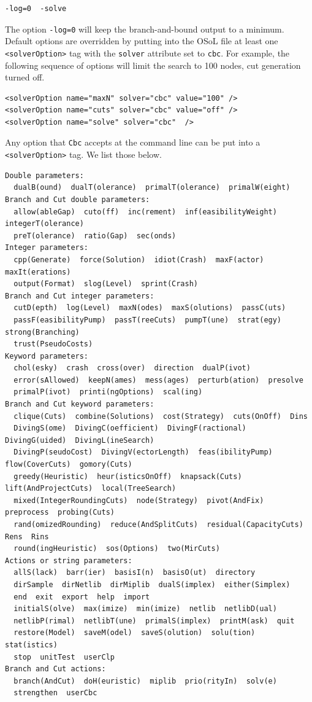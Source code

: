 \begin{verbatim}
-log=0  -solve 
\end{verbatim}
The option {\tt -log=0} will keep the branch-and-bound output to a minimum.  Default options are overridden by 
putting into the OSoL file at least one {\tt <solverOption>} tag with the {\tt solver} attribute 
set to {\tt cbc}.    For example, the following sequence of options will limit the search to 100 nodes, 
cut generation turned off.

\begin{verbatim}
<solverOption name="maxN" solver="cbc" value="100" />
<solverOption name="cuts" solver="cbc" value="off" />
<solverOption name="solve" solver="cbc"  />
\end{verbatim}

Any option that {\tt Cbc} accepts at the command line can be put into a {\tt <solverOption>} tag. We list  those below.

{\small
\begin{verbatim}
Double parameters:
  dualB(ound)  dualT(olerance)  primalT(olerance)  primalW(eight)  
Branch and Cut double parameters:
  allow(ableGap)  cuto(ff)  inc(rement)  inf(easibilityWeight)  integerT(olerance)  
  preT(olerance)  ratio(Gap)  sec(onds)  
Integer parameters:
  cpp(Generate)  force(Solution)  idiot(Crash)  maxF(actor)  maxIt(erations)  
  output(Format)  slog(Level)  sprint(Crash)  
Branch and Cut integer parameters:
  cutD(epth)  log(Level)  maxN(odes)  maxS(olutions)  passC(uts)  
  passF(easibilityPump)  passT(reeCuts)  pumpT(une)  strat(egy)  strong(Branching)  
  trust(PseudoCosts)  
Keyword parameters:
  chol(esky)  crash  cross(over)  direction  dualP(ivot)  
  error(sAllowed)  keepN(ames)  mess(ages)  perturb(ation)  presolve  
  primalP(ivot)  printi(ngOptions)  scal(ing)  
Branch and Cut keyword parameters:
  clique(Cuts)  combine(Solutions)  cost(Strategy)  cuts(OnOff)  Dins  
  DivingS(ome)  DivingC(oefficient)  DivingF(ractional)  DivingG(uided)  DivingL(ineSearch)  
  DivingP(seudoCost)  DivingV(ectorLength)  feas(ibilityPump)  flow(CoverCuts)  gomory(Cuts)  
  greedy(Heuristic)  heur(isticsOnOff)  knapsack(Cuts)  lift(AndProjectCuts)  local(TreeSearch)  
  mixed(IntegerRoundingCuts)  node(Strategy)  pivot(AndFix)  preprocess  probing(Cuts)  
  rand(omizedRounding)  reduce(AndSplitCuts)  residual(CapacityCuts)  Rens  Rins  
  round(ingHeuristic)  sos(Options)  two(MirCuts)  
Actions or string parameters:
  allS(lack)  barr(ier)  basisI(n)  basisO(ut)  directory  
  dirSample  dirNetlib  dirMiplib  dualS(implex)  either(Simplex)  
  end  exit  export  help  import  
  initialS(olve)  max(imize)  min(imize)  netlib  netlibD(ual)  
  netlibP(rimal)  netlibT(une)  primalS(implex)  printM(ask)  quit  
  restore(Model)  saveM(odel)  saveS(olution)  solu(tion)  stat(istics)  
  stop  unitTest  userClp  
Branch and Cut actions:
  branch(AndCut)  doH(euristic)  miplib  prio(rityIn)  solv(e)  
  strengthen  userCbc  
\end{verbatim}
}


